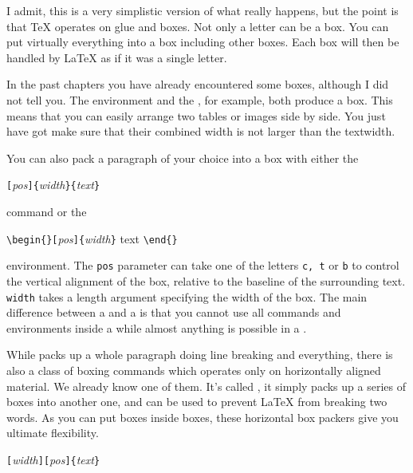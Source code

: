 I admit, this is a very simplistic version of what really happens, but
the point is that \TeX{} operates on glue and boxes. Not only a letter
can be a box. You can put virtually everything into a box including
other boxes. Each box will then be handled by \LaTeX{} as if it was a
single letter.

In the past chapters you have already encountered some boxes, although
I did not tell you. The  environment and the
, for example, both produce a box. This means that you can
easily arrange two tables or images side by side. You just have got
make sure that their combined width is not larger than the textwidth.

You can also pack a paragraph of your choice into a box with either
the

\begin{command}
\verb|[|\emph{pos}\verb|]{|\emph{width}\verb|}{|\emph{text}\verb|}|
\end{command}

\noindent command or the

\begin{command}
\verb|\begin{|\verb|}[|\emph{pos}\verb|]{|\emph{width}\verb|}| text
\verb|\end{|\verb|}|
\end{command}

\noindent environment. The \texttt{pos} parameter can take one of the letters
\texttt{c, t} or \texttt{b} to control the vertical alignment of the box,
relative to the baseline of the surrounding text. \texttt{width} takes
a length argument specifying the width of the box. The main difference
between a  and a  is that you cannot use all commands
and environments inside a  while almost anything is possible in
a .

While  packs up a whole paragraph doing line breaking and
everything, there is also a class of boxing commands which operates
only on horizontally aligned material. We already know one of them.
It's called , it simply packs up a series of boxes into
another one, and can be used to prevent \LaTeX{} from breaking two
words. As you can put boxes inside boxes, these horizontal box packers
give you ultimate flexibility.

\begin{command}
\verb|[|\emph{width}\verb|][|\emph{pos}\verb|]{|\emph{text}\verb|}|
\end{command}

